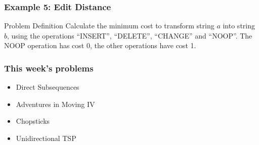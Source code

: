 \documentclass{beamer}
\begin{document}
\begin{frame}
  \frametitle{Example 5: Edit Distance}
  \begin{block}{Problem Definition}
    Calculate the minimum cost to transform string $a$ into string
    $b$, using the operations ``INSERT'', ``DELETE'', ``CHANGE'' and
    ``NOOP''. The NOOP operation has cost 0, the other operations have
    cost 1.
  \end{block}
\end{frame}

\begin{frame}
  \frametitle{This week's problems}
  \begin{itemize}
  \item Direct Subsequences        
  \item Adventures in Moving IV
  \item Chopsticks
  \item Unidirectional TSP
  \end{itemize}
\end{frame}
\end{document}
